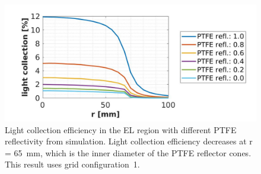 \begin{figure}[!p]
	\centering
	\includegraphics[width=.7\textwidth]
	{Figures/GasTest/LGresult/PTFESWeep.jpg}
	\caption[Light collection efficiency in the EL region with different PTFE reflectivity from simulation.]{Light collection efficiency in the EL region with different PTFE reflectivity from simulation. Light collection efficiency decreases at r = \SI{65}{\mm}, which is the inner diameter of the PTFE reflector cones. This result uses grid configuration~1.  }
	\label{fig: light collection vs. PTFE ref} %
\end{figure}

%











